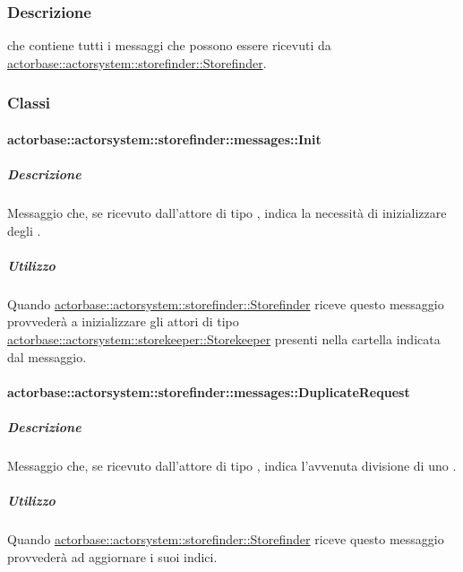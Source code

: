 \documentclass{scalatekids-article}
\begin{document}
\subsubsection{Descrizione}

 che contiene tutti i messaggi che possono essere ricevuti da
\hyperref[sec:actorbase::actorsystem::storefinder::Storefinder]{actorbase::actorsystem::storefinder::Storefinder}.

\subsubsection{Classi}

\paragraph{actorbase::actorsystem::storefinder::messages::Init}
\label{sec:actorbase::actorsystem::storefinder::messages::Init}

\subparagraph{Descrizione}

Messaggio che, se ricevuto dall'attore di tipo ,
indica la necessità di inizializzare degli .

\subparagraph{Utilizzo}

Quando \hyperref[sec:actorbase::actorsystem::storefinder::Storefinder]{actorbase::\allowbreak{}actorsystem::\allowbreak{}storefinder::\allowbreak{}Storefinder}
riceve questo messaggio provvederà a inizializzare gli attori di tipo
\hyperref[sec:actorbase::actorsystem::storekeeper::Storekeeper]{actorbase::\allowbreak{}actorsystem::\allowbreak{}storekeeper::\allowbreak{}Storekeeper}
presenti nella cartella indicata dal messaggio.

\paragraph{actorbase::actorsystem::storefinder::messages::DuplicateRequest}
\label{sec:actorbase::actorsystem::storefinder::messages::DuplicateRequest}

\subparagraph{Descrizione}

Messaggio che, se ricevuto dall'attore di tipo ,
indica l'avvenuta divisione di uno .

\subparagraph{Utilizzo}

Quando \hyperref[sec:actorbase::actorsystem::storefinder::Storefinder]{actorbase::\allowbreak{}actorsystem::\allowbreak{}storefinder::\allowbreak{}Storefinder}
riceve questo messaggio provvederà ad aggiornare i suoi indici.
\end{document}
